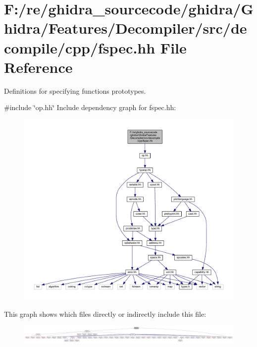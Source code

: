 \hypertarget{fspec_8hh}{}\section{F\+:/re/ghidra\+\_\+sourcecode/ghidra/\+Ghidra/\+Features/\+Decompiler/src/decompile/cpp/fspec.hh File Reference}
\label{fspec_8hh}


Definitions for specifying functions prototypes.  


{\ttfamily \#include \char`\"{}op.\+hh\char`\"{}}\newline
Include dependency graph for fspec.\+hh\+:
\nopagebreak
\begin{figure}[H]
\begin{center}
\leavevmode
\includegraphics[width=350pt]{fspec_8hh__incl}
\end{center}
\end{figure}
This graph shows which files directly or indirectly include this file\+:
\nopagebreak
\begin{figure}[H]
\begin{center}
\leavevmode
\includegraphics[width=350pt]{fspec_8hh__dep__incl}
\end{center}
\end{figure}
